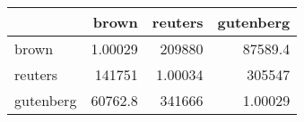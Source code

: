 \begin{tabular}{lrrr}
\hline
           &        brown &      reuters &    gutenberg \\
\hline
 brown     &      1.00029 & 209880       &  87589.4     \\
 reuters   & 141751       &      1.00034 & 305547       \\
 gutenberg &  60762.8     & 341666       &      1.00029 \\
\hline
\end{tabular}